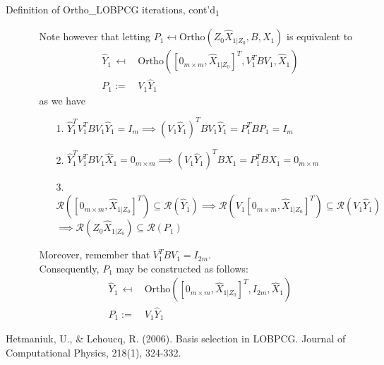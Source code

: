 \documentclass[t,usepdftitle=false]{beamer}
\begin{document}
\begin{frame}{Definition of Ortho\_LOBPCG iterations, cont'd\textsubscript{1}}
	\begin{itemize}
	\item[] 
	\begin{itemize}
	\item[]
	Note however that letting $P_1\mapsfrom\text{Ortho}(Z_0\hat{X}_{1|Z_0},B,X_1)$ is equivalent to
	\begin{align*}
	\hat{Y}_1\,\mapsfrom&\,\text{Ortho}([0_{m\times m},\hat{X}_{1|Z_0}]^T,V_1^TBV_1,\hat{X}_1)\\
	P_1:=&\,V_1\hat{Y}_1
	\end{align*}
	as we have\medskip
	\begin{enumerate}
	\item[1.]$\hat{Y}_1^TV_1^TBV_1\hat{Y}_1=I_{m}
	\implies
	(V_1\hat{Y}_1)^TBV_1\hat{Y}_1=
	P_1^TBP_1=I_{m}$\smallskip		
	\item[2.]$\hat{Y}_1^TV_1^TBV_1\hat{X}_1=0_{m\times m}
	\implies
	(V_1\hat{Y}_1)^TBX_1=
	P_1^TBX_1=0_{m\times m}$\smallskip
	\item[3.] $\mathcal{R}([0_{m\times m},\hat{X}_{1|Z_0}]^T)\subseteq\mathcal{R}(\hat{Y}_1)
	\implies
	\mathcal{R}(V_1[0_{m\times m},\hat{X}_{1|Z_0}]^T)\subseteq\mathcal{R}(V_1\hat{Y}_1)$\\
	\hspace{4.12cm}$\implies
	\mathcal{R}(Z_0\hat{X}_{1|Z_0})\subseteq\mathcal{R}(P_1)$
	\end{enumerate}\medskip
	Moreover, remember that $V_1^TBV_1=I_{2m}$.\\
	Consequently, $P_1$ may be constructed as follows:
	\begin{align*}
	\hat{Y}_1\,\mapsfrom&\,\text{Ortho}([0_{m\times m},\hat{X}_{1|Z_0}]^T,I_{2m},\hat{X}_1)\\
	P_1:=&\,V_1\hat{Y}_1
	\end{align*}	
	\end{itemize}
	\end{itemize}
	\medskip
	\tiny{Hetmaniuk, U., \& Lehoucq, R. (2006). Basis selection in LOBPCG. Journal of Computational Physics, 218(1), 324-332.}
\end{frame}
\end{document}
